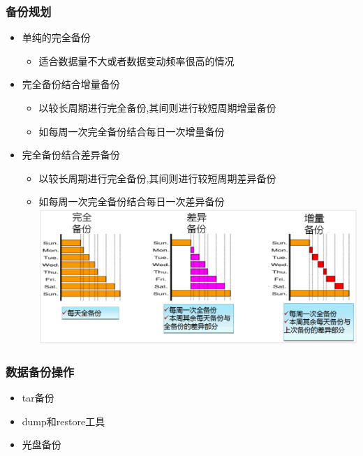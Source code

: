 \documentclass[xcolor=svgnames,presentation]{beamer}
\begin{document}
\begin{frame}
\frametitle{备份规划}
\label{sec-7-4}
\begin{itemize}

\item 单纯的完全备份
\label{sec-7-4-1}%
\begin{itemize}

\item 适合数据量不大或者数据变动频率很高的情况
\label{sec-7-4-1-1}%
\end{itemize} %

\item 完全备份结合增量备份
\label{sec-7-4-2}%
\begin{itemize}

\item 以较长周期进行完全备份,其间则进行较短周期增量备份
\label{sec-7-4-2-1}%

\item 如每周一次完全备份结合每日一次增量备份
\label{sec-7-4-2-2}%
\end{itemize} %

\item 完全备份结合差异备份
\label{sec-7-4-3}%
\begin{itemize}

\item 以较长周期进行完全备份,其间则进行较短周期差异备份
\label{sec-7-4-3-1}%

\item 如每周一次完全备份结合每日一次差异备份\\
\label{sec-7-4-3-2}%
\includegraphics[width=.9\linewidth]{img/backup2.jpg}
\end{itemize} %
\end{itemize} %
\end{frame}
\begin{frame}
\frametitle{数据备份操作}
\label{sec-7-5}
\begin{itemize}

\item tar备份
\label{sec-7-5-1}%

\item dump和restore工具
\label{sec-7-5-2}%

\item 光盘备份
\label{sec-7-5-3}%
\end{itemize} %
\end{frame}
\end{document}

